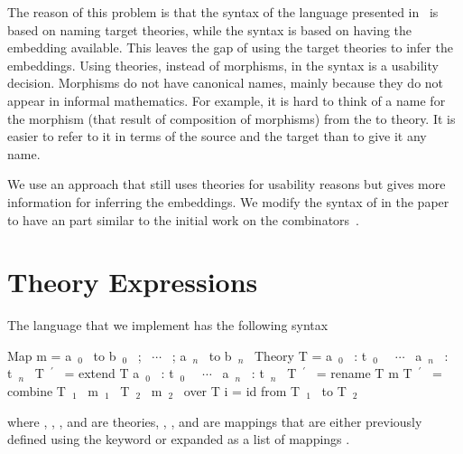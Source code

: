 The reason of this problem is that the syntax of the language presented in~\cite{carette2018building} is based on naming target theories, while the syntax is based on having the embedding available. This leaves the gap of using the target theories to infer the embeddings. Using theories, instead of morphisms, in the syntax is a usability decision. Morphisms do not have canonical names, mainly because they do not appear in informal mathematics. For example, it is hard to think of a name for the morphism (that result of composition of morphisms) from the  to  theory. It is easier to refer to it in terms of the source and the target than to give it any name. 

We use an approach that still uses theories for usability reasons but gives more information for inferring the embeddings. We modify the syntax of  in the paper to have an  part similar to the initial work on the combinators~\cite{CaretteOConnorTPC}. 

\begin{comment}
\subsection{All Paths Commute Approach} 
\ednote{@JC: Do we need to remove mixin, so all paths commute?} 
When referring to a morphism using its source and target, we implicitly assume that all paths commute, i.e.: Given the source and target, they either is no path, one path, or multiple paths that commute between them. 

In Section~\ref{sec:background:morphisms}, we discussed the three types of morphisms, identity, embeddings and general morphisms. We also noted in Section~\ref{subsec:mixin} that the only combinator that accepts and generates a general morphism is \lstmath{mixin}. If we restrict our language to \lstmath{extension}, \lstmath{rename}, and \lstmath{combine}, we end up with an all-embeddings graph, in which all paths commute. 
\end{comment}

\section{Theory Expressions}
\label{sec:impl:expressions}
The language that we implement has the following syntax
\begin{togcode}
 Map m = {a~$_0$~ to b~$_0$~ ; ~$\cdots$~ ; a~$_n$~ to b~$_n$~}
 Theory T = {a~$_0$~ : t~$_0$~ ~$\cdots$~ a~$_n$~ : t~$_n$~}
 T~$^\prime$~ = extend T {a~$_0$~ : t~$_0$~ ~$\cdots$~ a~$_n$~ : t~$_n$~}
 T~$^\prime$~ = rename T m 
 T~$^\prime$~ = combine T~$_1$~ m~$_1$~ T~$_2$~ m~$_2$~ over T
 i = id from T~$_1$~ to T~$_2$~
\end{togcode} 
\noindent where , , , and  are theories, , , and  are mappings that are either previously defined using the  keyword or expanded as a list of mappings 
. 

